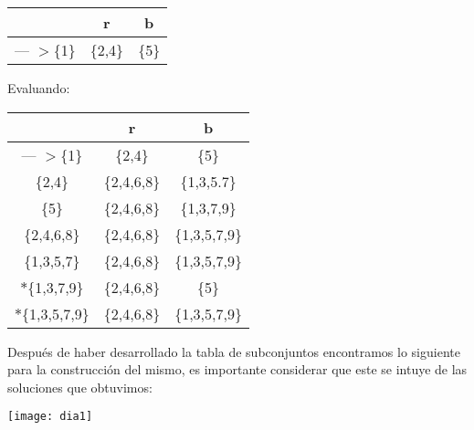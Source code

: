 \documentclass[12pt]{article}
\begin{document}
        \begin{center}
            \begin{table}[ht]
                \centering
                \begin{tabular}{c|c|c}
                    &r &b\\
               	\hline
                	--- $>$\{1\}&\{2,4\}&\{5\}\\
           	 \end{tabular}
            \end{table}
            Evaluando:
            \begin{table}[ht]
                \centering
                \begin{tabular}{c|c|c}
                    &r &b\\
               	\hline
                	--- $>$\{1\}&\{2,4\}&\{5\}\\
		\{2,4\}&\{2,4,6,8\}&\{1,3,5.7\}\\
		\{5\}&\{2,4,6,8\}&\{1,3,7,9\}\\
		\{2,4,6,8\}&\{2,4,6,8\}&\{1,3,5,7,9\}\\
		\{1,3,5,7\}&\{2,4,6,8\}&\{1,3,5,7,9\}\\
		$ *$\{1,3,7,9\}&\{2,4,6,8\}&\{5\}\\
		$ *$\{1,3,5,7,9\}&\{2,4,6,8\}&\{1,3,5,7,9\}\\
           	 \end{tabular}
            \end{table}
            
        \end{center}
        Después de haber desarrollado la tabla de subconjuntos encontramos lo siguiente para la construcción del mismo, es importante considerar que este se intuye de las soluciones que obtuvimos:
        \begin{center}
              \texttt{[image: dia1]}
        \end{center}
        
        
        \newpage
\end{document}
